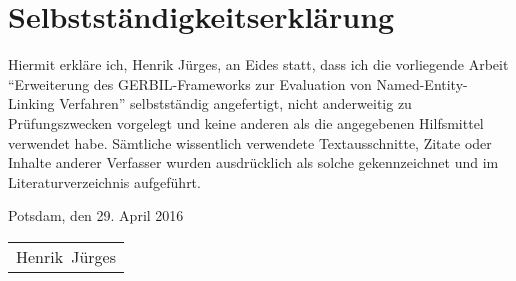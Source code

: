 \section*{Selbstständigkeitserklärung}

Hiermit erkläre ich, Henrik Jürges, an Eides statt, dass ich die vorliegende Arbeit
"`Erweiterung des GERBIL-Frameworks zur Evaluation von Named-Entity-Linking Verfahren"'
selbstständig angefertigt, nicht anderweitig zu Prüfungszwecken vorgelegt und
keine anderen als die angegebenen Hilfsmittel verwendet habe. Sämtliche 
wissentlich verwendete Textausschnitte, Zitate oder Inhalte anderer Verfasser 
wurden ausdrücklich als solche gekennzeichnet und im Literaturverzeichnis aufgeführt.
\vspace{2mm}

Potsdam, den 29. April 2016
\vspace{4mm}

\newlength\us
\settowidth{\us}{-Henrik~Jürges-}
\begin{tabular}{p{\us}}\hline
\centering\footnotesize Henrik~Jürges
\end{tabular}